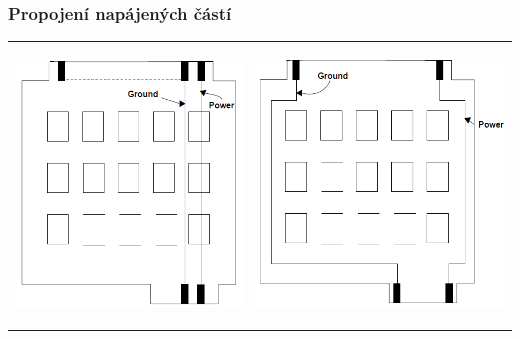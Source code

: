 \documentclass{beamer}
\begin{document}
  \begin{frame}
    \frametitle{Propojení napájených částí}
		
    \begin{tabular}{ p{55mm} | p{55mm} }
				\hline
				\begin{center}
					\includegraphics[scale=0.45]{obr/privod_napajeni_nevhodne.png} 
				\end{center} &
				
				\begin{center}
					\includegraphics[scale=0.45]{obr/privod_napajeni_vhodne.png} 
				\end{center} \\
				

\end{tabular}
\end{frame}
\end{document}
